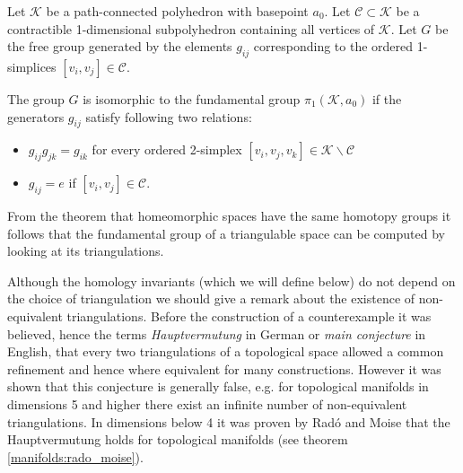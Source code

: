	\begin{theorem}
		Let $\mathcal{K}$ be a path-connected polyhedron with basepoint $a_0$. Let $\mathcal{C}\subset\mathcal{K}$ be a contractible 1-dimensional subpolyhedron containing all vertices of $\mathcal{K}$. Let $G$ be the free group generated by the elements $g_{ij}$ corresponding to the ordered 1-simplices $[v_i,v_j]\in\mathcal{C}$.

		The group $G$ is isomorphic to the fundamental group $\pi_1(\mathcal{K}, a_0)$ if the generators $g_{ij}$ satisfy following two relations:
		\begin{itemize}
			\item $g_{ij}g_{jk} = g_{ik}$ for every ordered 2-simplex $[v_i,v_j,v_k]\in\mathcal{K}\backslash\mathcal{C}$
			\item $g_{ij} = e$ if $[v_i,v_j]\in\mathcal{C}$.
		\end{itemize}
	\end{theorem}
	\begin{result}
		From the theorem that homeomorphic spaces have the same homotopy groups it follows that the fundamental group of a triangulable space can be computed by looking at its triangulations.
	\end{result}

	\begin{remark}[Hauptvermutung]
		Although the homology invariants (which we will define below) do not depend on the choice of triangulation we should give a remark about the existence of non-equivalent triangulations. Before the construction of a counterexample it was believed, hence the terms \textit{Hauptvermutung} in German or \textit{main conjecture} in English, that every two triangulations of a topological space allowed a common refinement and hence where equivalent for many constructions. However it was shown that this conjecture is generally false, e.g. for topological manifolds in dimensions 5 and higher there exist an infinite number of non-equivalent triangulations. In dimensions below 4 it was proven by Rad\'o and Moise that the Hauptvermutung holds for topological manifolds (see theorem \ref{manifolds:rado_moise}).
	\end{remark}


